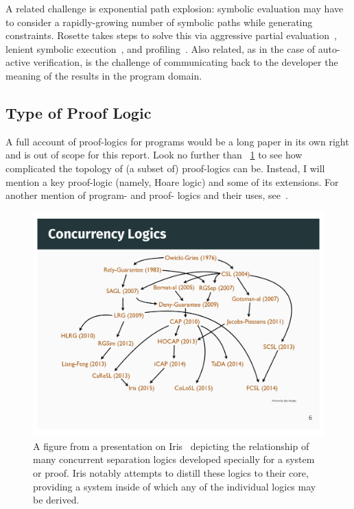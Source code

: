 A related challenge is exponential path explosion: symbolic evaluation may have
to consider a rapidly-growing number of symbolic paths while generating
constraints. Rosette takes steps to solve this via aggressive partial
evaluation~\cite{Torlak_2013,Torlak_2014}, lenient symbolic
execution~\cite{Chang_2018}, and
profiling~\cite{Bornholt_2018,Porncharoenwase_2020}. Also related, as in the
case of auto-active verification, is the challenge of communicating back to the
developer the meaning of the results in the program domain.

\subsection{Type of Proof Logic}\label{S:t_logic}

A full account of proof-logics for programs would be a long paper in its own
right and is out of scope for this report. Look no further than
\figurename~\ref{F:iris_complex} to see how complicated the topology of (a
subset of) proof-logics can be. Instead, I will mention a key proof-logic
(namely, Hoare logic) and some of its extensions. For another mention of
program- and proof- logics and their uses, see~\cite[\S 5]{Appel_2011}.

\begin{figure}
    \centering
    \includegraphics[width=\textwidth]{img/iris_2_0_concurrent_logics}
    \caption{A figure from a presentation on Iris~\cite{Jung_2016_slides}
    depicting the relationship of many concurrent separation logics developed
    specially for a system or proof. Iris notably attempts to distill these
    logics to their core, providing a system inside of which any of the
    individual logics may be derived.}\label{F:iris_complex}
\end{figure}

